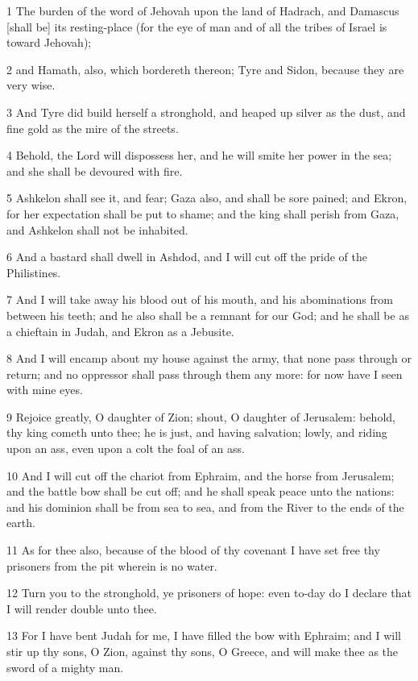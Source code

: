 \par 1 The burden of the word of Jehovah upon the land of Hadrach, and Damascus [shall be] its resting-place (for the eye of man and of all the tribes of Israel is toward Jehovah);
\par 2 and Hamath, also, which bordereth thereon; Tyre and Sidon, because they are very wise.
\par 3 And Tyre did build herself a stronghold, and heaped up silver as the dust, and fine gold as the mire of the streets.
\par 4 Behold, the Lord will dispossess her, and he will smite her power in the sea; and she shall be devoured with fire.
\par 5 Ashkelon shall see it, and fear; Gaza also, and shall be sore pained; and Ekron, for her expectation shall be put to shame; and the king shall perish from Gaza, and Ashkelon shall not be inhabited.
\par 6 And a bastard shall dwell in Ashdod, and I will cut off the pride of the Philistines.
\par 7 And I will take away his blood out of his mouth, and his abominations from between his teeth; and he also shall be a remnant for our God; and he shall be as a chieftain in Judah, and Ekron as a Jebusite.
\par 8 And I will encamp about my house against the army, that none pass through or return; and no oppressor shall pass through them any more: for now have I seen with mine eyes.
\par 9 Rejoice greatly, O daughter of Zion; shout, O daughter of Jerusalem: behold, thy king cometh unto thee; he is just, and having salvation; lowly, and riding upon an ass, even upon a colt the foal of an ass.
\par 10 And I will cut off the chariot from Ephraim, and the horse from Jerusalem; and the battle bow shall be cut off; and he shall speak peace unto the nations: and his dominion shall be from sea to sea, and from the River to the ends of the earth.
\par 11 As for thee also, because of the blood of thy covenant I have set free thy prisoners from the pit wherein is no water.
\par 12 Turn you to the stronghold, ye prisoners of hope: even to-day do I declare that I will render double unto thee.
\par 13 For I have bent Judah for me, I have filled the bow with Ephraim; and I will stir up thy sons, O Zion, against thy sons, O Greece, and will make thee as the sword of a mighty man.
